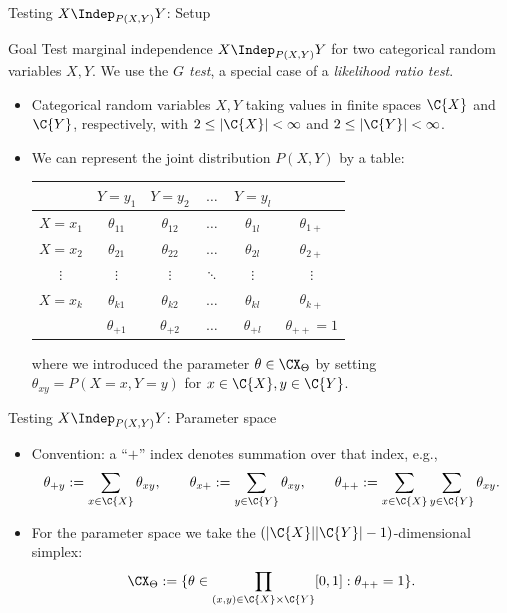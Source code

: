 \begin{frame}{Testing $X \Indep_{P(X,Y)} Y$: Setup}
  \begin{block}{Goal}
    Test marginal independence $X \Indep_{P(X,Y)} Y$ for two categorical random variables $X,Y$.
    We use the \emph{$G$ test}, a special case of a \emph{likelihood ratio test}.
  \end{block}
  \begin{itemize}
    \item Categorical random variables $X,Y$ taking values in finite spaces $\C{X}$ and $\C{Y}$,
respectively, with $2 \le |\C{X}| < \infty$ and $2 \le |\C{Y}| < \infty$.
    \item We can represent the joint distribution $P(X,Y)$ by a table:
\begin{center}\small\begin{tabular}{c|cccc|c}
  & $Y=y_1$         & $Y=y_2$ & $\dots$ & $Y=y_l$ \\
  \hline
  $X=x_1$ & $\theta_{11}$      & $\theta_{12}$      & $\dots$ & $\theta_{1l}$ & $\theta_{1+}$\\
  $X=x_2$ & $\theta_{21}$      & $\theta_{22}$      & $\dots$ & $\theta_{2l}$ & $\theta_{2+}$\\
  $\vdots$ & $\vdots$     & $\vdots$       & $\ddots$ & $\vdots$  & $\vdots$ \\
  $X=x_k$ & $\theta_{k1}$      & $\theta_{k2}$      & $\dots$ & $\theta_{kl}$ & $\theta_{k+}$ \\
  \hline
  & $\theta_{+ 1}$ & $\theta_{+ 2}$ & $\dots$ & $\theta_{+ l}$ & $\theta_{++}=1$\\
\end{tabular}\end{center}
      where we introduced the parameter $\theta \in \CX_\Theta$ by setting $\theta_{xy} = P(X=x,Y=y)$ for
$x \in \C{X}, y \in \C{Y}$.
  \end{itemize}
\end{frame}

\begin{frame}{Testing $X \Indep_{P(X,Y)} Y$: Parameter space}
  \begin{itemize}
\item Convention: a ``$+$'' index denotes summation over that index, e.g.,
$$\theta_{+ y} := \sum_{x\in\C{X}} \theta_{xy}, \qquad \theta_{x+} := \sum_{y\in\C{Y}} \theta_{xy}, \qquad \theta_{++} := \sum_{x\in\C{X}}\sum_{y\in\C{Y}} \theta_{xy}.$$
\item For the parameter space we take the $(|\C{X}||\C{Y}|-1)$-dimensional simplex:
  $$\CX_\Theta := \{ \theta \in \prod_{(x,y)\in\C{X}\times\C{Y}} [0,1] : \theta_{+ +} = 1 \}.$$
  \end{itemize}
\end{frame}

